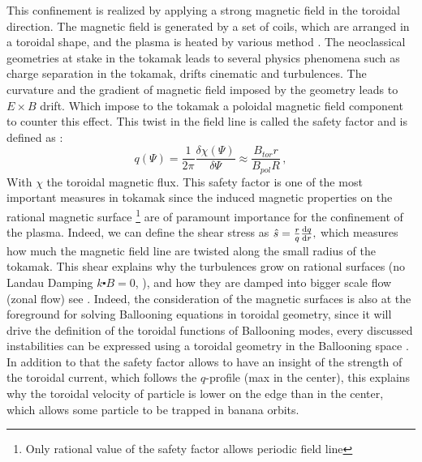 \documentclass[11pt,a4paper,openany]{report}
\begin{document}
\begin{multicols}{2}
    This confinement is realized by applying a strong magnetic field in the toroidal direction. The magnetic field is generated by a set of coils, which are arranged in a toroidal shape, and the plasma is heated by various method \cite{Heating}. The neoclassical geometries at stake in the tokamak leads to several physics phenomena such as charge separation in the tokamak, drifts cinematic and turbulences. The curvature and the gradient of magnetic field \cite{piel2018plasma} imposed by the geometry leads to $E \times B$ drift. Which impose to the tokamak a poloidal magnetic field component to counter this effect. This twist in the field line is called the safety factor and is defined as :
    $$q(\Psi) = \frac{1}{2\pi}\frac{\delta \chi (\Psi)}{\delta \Psi} \approx \frac{B_{tor}r}{B_{pol}R} \, ,$$
    With $\chi$ the toroidal magnetic flux. This safety factor is one of the most important measures in tokamak since the induced magnetic properties on the rational magnetic surface \footnote{Only rational value of the safety factor allows periodic field line} are of paramount importance for the confinement of the plasma. Indeed, we can define the shear stress as $\hat{s} = \frac{r}{q}\dv{q}{r},$ which measures how much the magnetic field line are twisted along the small radius of the tokamak. This shear explains why the turbulences grow on rational surfaces (no Landau Damping $k \centerdot B = 0$, \cite{TEM_landau_rational}), and how they are damped into bigger scale flow (zonal flow) see \cite{Scaling_TEM}.
    Indeed, the consideration of the magnetic surfaces is also at the foreground for solving Ballooning equations in toroidal geometry, since it will drive the definition of the toroidal functions of Ballooning modes, every discussed instabilities can be expressed using a toroidal geometry in the Ballooning space \cite{TEM_ballooning,DW_transport}. In addition to that the safety factor allows to have an insight of the strength of the toroidal current, which follows the $q$-profile (max in the center), this explains why the toroidal velocity of particle is lower on the edge than in the center, which allows some particle to be trapped in banana orbits.



\end{multicols}
\end{document}
